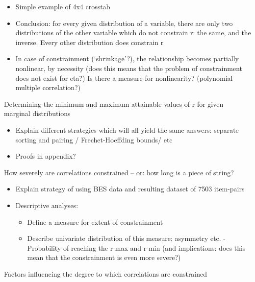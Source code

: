 \documentclass[
  12pt,
]{article}
\providecommand{\tightlist}{%
  \setlength{\itemsep}{0pt}\setlength{\parskip}{0pt}}\usepackage{longtable,booktabs,array}
\theoremstyle{plain}
\theoremstyle{definition}
\theoremstyle{remark}
\begin{document}
\begin{itemize}
\tightlist
\item
  Simple example of 4x4 crosstab
\item
  Conclusion: for every given distribution of a variable, there are only
  two distributions of the other variable which do not constrain r: the
  same, and the inverse. Every other distribution does constrain r
\item
  In case of constrainment (`shrinkage'?), the relationship becomes
  partially nonlinear, by necessity (does this means that the problem of
  constrainment does not exist for eta?) Is there a measure for
  nonlinearity? (polynomial multiple correlation?)
\end{itemize}

Determining the minimum and maximum attainable values of r for given
marginal distributions

\begin{itemize}
\tightlist
\item
  Explain different strategies which will all yield the same answers:
  separate sorting and pairing / Frechet-Hoeffding bounds/ etc
\item
  Proofs in appendix?
\end{itemize}

How severely are correlations constrained -- or: how long is a piece of
string?

\begin{itemize}
\tightlist
\item
  Explain strategy of using BES data and resulting dataset of 7503
  item-pairs
\item
  Descriptive analyses:

  \begin{itemize}
  \tightlist
  \item
    Define a measure for extent of constrainment
  \item
    Describe univariate distribution of this measure; asymmetry etc.
    -Probability of reaching the r-max and r-min (and implications: does
    this mean that the constrainment is even more severe?)
  \end{itemize}
\end{itemize}

Factors influencing the degree to which correlations are constrained
\end{document}
